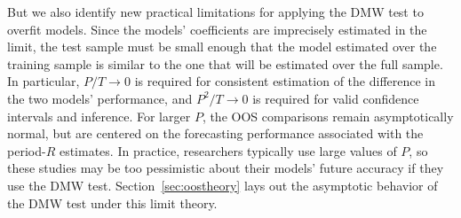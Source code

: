 \documentclass[11pt]{article}
\begin{document}
But we also identify new practical limitations for applying the DMW
test to overfit models.
Since the models' coefficients are imprecisely estimated in the limit,
the test sample must be small enough that the model estimated over the
training sample is similar to the one that will be estimated over the
full sample.  In particular, $P/T \to 0$ is required for consistent
estimation of the difference in the two models' performance,
and $P^2/T \to 0$ is required for valid confidence
intervals and inference.  For larger $P$, the OOS comparisons remain
asymptotically normal, but are centered on the forecasting performance
associated with the period-$R$ estimates.  In practice, researchers
typically use large values of $P$, so these studies may be too
pessimistic about their models' future accuracy if they use the DMW
test.  Section~\ref{sec:oostheory} lays out the asymptotic behavior of
the DMW test under this limit theory.
\end{document}

